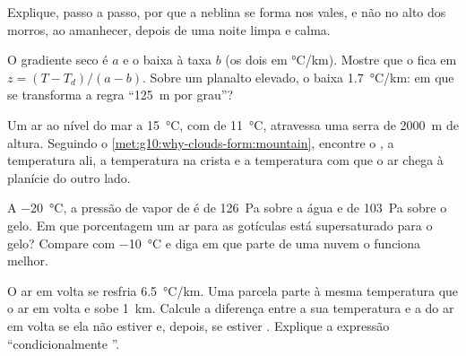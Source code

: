 \begin{exercise}[$\star\star$]\label{exo:g10:why-clouds-form:11}
Explique, passo a passo, por que a neblina se forma nos vales, e não no alto
dos morros, ao amanhecer, depois de uma noite limpa e calma.
\end{exercise}

\begin{exercise}[$\star\star\star$]\label{exo:g10:why-clouds-form:12}
O gradiente seco é $a$ e o  baixa à taxa $b$ (os dois em
\unit{\degreeCelsius/km}). Mostre que o  fica em
$z = (T - T_d)/(a - b)$. Sobre um planalto elevado, o 
baixa \qty{1.7}{\degreeCelsius/km}: em que se transforma a regra
``\qty{125}{m} por grau''?
\end{exercise}

\begin{exercise}[$\star\star\star$]\label{exo:g10:why-clouds-form:13}
Um ar ao nível do mar a \qty{15}{\degreeCelsius}, com  de
\qty{11}{\degreeCelsius}, atravessa uma serra de \qty{2000}{m} de altura.
Seguindo o \cref{met:g10:why-clouds-form:mountain}, encontre o , a temperatura ali, a temperatura na crista e a temperatura com
que o ar chega à planície do outro lado.
\end{exercise}

\begin{exercise}[$\star\star\star$]\label{exo:g10:why-clouds-form:14}
A \qty{-20}{\degreeCelsius}, a pressão de vapor de  é de
\qty{126}{Pa} sobre a água e de \qty{103}{Pa} sobre o gelo. Em que
porcentagem um ar  para as gotículas está supersaturado para o
gelo? Compare com \qty{-10}{\degreeCelsius} e diga em que parte de uma
nuvem o  funciona melhor.
\end{exercise}

\begin{exercise}[$\star\star\star$]\label{exo:g10:why-clouds-form:15}
O ar em volta se resfria \qty{6.5}{\degreeCelsius/km}. Uma parcela parte à
mesma temperatura que o ar em volta e sobe \qty{1}{km}. Calcule a diferença
entre a sua temperatura e a do ar em volta se ela não estiver  e,
depois, se estiver . Explique a expressão ``condicionalmente
''.
\end{exercise}

